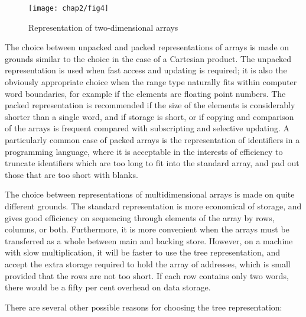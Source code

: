 \begin{figure}[h]
	\centering
	\texttt{[image: chap2/fig4]}
	\caption{Representation of two-dimensional arrays}
\end{figure}

The choice between unpacked and packed representations of arrays is made on grounds similar to the choice in the case of a Cartesian product. The unpacked representation is used when fast access and updating is required; it is also the obviously appropriate choice when the range type naturally fits within computer word boundaries, for example if the elements are floating point numbers. The packed representation is recommended if the size of the elements is considerably shorter than a single word, and if storage is short, or if copying and comparison of the arrays is frequent compared with subscripting and selective updating. A particularly common case of packed arrays is the representation of identifiers in a programming language, where it is acceptable in the interests of efficiency to truncate identifiers which are too long to fit into the standard array, and pad out those that are too short with blanks.

The choice between representations of multidimensional arrays is made on quite different grounds. The standard representation is more economical of storage, and gives good efficiency on sequencing through elements of the array by rows, columns, or both. Furthermore, it is more convenient when the arrays must be transferred as a whole between main and backing store. However, on a machine with slow multiplication, it will be faster to use the tree representation, and accept the extra storage required to hold the array of addresses, which is small provided that the rows are not too short. If each row contains only two words, there would be a fifty per cent overhead on data storage.

There are several other possible reasons for choosing the tree representation:

